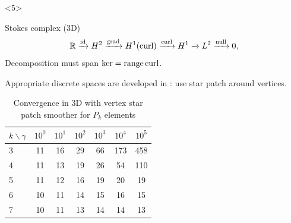 \documentclass[presentation,aspectratio=43, 10pt]{beamer}
\DeclareMathOperator{\grad}{grad}
\let\div\relax
\DeclareMathOperator{\div}{div}
\DeclareMathOperator{\curl}{curl}
\DeclareMathOperator{\range}{range}
\begin{document}
\begin{frame}[fragile,t]
\begin{onlyenv}
\begin{onlyenv}
    \end{onlyenv}
  \end{onlyenv}
  \begin{onlyenv}<5>
      \begin{block}{Stokes complex (3D)}
        \begin{equation*}
          \mathbb{R} \xrightarrow{\operatorname{id}} H^2
          \xrightarrow{\grad} H^1(\curl) \xrightarrow{\curl} H^1 \xrightarrow{\div} L^2 \xrightarrow{\operatorname{null}} 0,
        \end{equation*}
        Decomposition must span $\ker \div = \range \curl$.

        Appropriate discrete spaces are developed in \textcite{Neilan:2015}: use
        star patch around vertices.
      \end{block}
    \begin{table}
      \centering
      {\footnotesize
      \begin{tabular}{l|cccccc}
        $k\backslash \gamma$ & $10^0$ & $10^1$ & $10^2$ & $10^3$ & $10^4$ & $10^5$ \\
        \toprule
        3                    & 11     & 16     & 29     & 66     & 173    & 458    \\
        4                    & 11     & 13     & 19     & 26     & 54
                                                                          & 110    \\
        \midrule
        5                    & 11     & 12     & 16     & 19     & 20     & 19     \\
        6                    & 10     & 11     & 14     & 15     & 16
                                                                          & 15     \\
        \midrule
        7                    & 10     & 11     & 13     & 14     & 14     & 13     \\
      \end{tabular}
      \caption{Convergence in 3D with vertex star patch smoother for
        $P_k$ elements}
      }
    \end{table}
  \end{onlyenv}
\end{frame}
\end{document}
